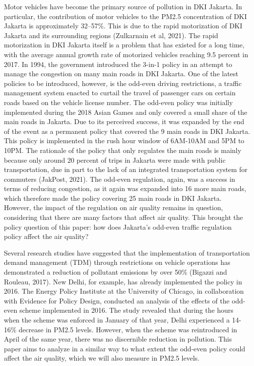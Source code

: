 \documentclass[
]{article}
\begin{document}
Motor vehicles have become the primary source of pollution in DKI
Jakarta. In particular, the contribution of motor vehicles to the PM2.5
concentration of DKI Jakarta is approximately 32--57\%. This is due to
the rapid motorization of DKI Jakarta and its surrounding regions
(Zulkarnain et al, 2021). The rapid motorization in DKI Jakarta itself
is a problem that has existed for a long time, with the average annual
growth rate of motorized vehicles reaching 9.5 percent in 2017. In 1994,
the government introduced the 3-in-1 policy in an attempt to manage the
congestion on many main roads in DKI Jakarta. One of the latest policies
to be introduced, however, is the odd-even driving restrictions, a
traffic management system enacted to curtail the travel of passenger
cars on certain roads based on the vehicle license number. The odd-even
policy was initially implemented during the 2018 Asian Games and only
covered a small share of the main roads in Jakarta. Due to its perceived
success, it was expanded by the end of the event as a permanent policy
that covered the 9 main roads in DKI Jakarta. This policy is implemented
in the rush hour window of 6AM-10AM and 5PM to 10PM. The rationale of
the policy that only regulates the main roads is mainly because only
around 20 percent of trips in Jakarta were made with public
transportation, due in part to the lack of an integrated transportation
system for commuters (JakPost, 2021). The odd-even regulation, again,
was a success in terms of reducing congestion, as it again was expanded
into 16 more main roads, which therefore made the policy covering 25
main roads in DKI Jakarta. However, the impact of the regulation on air
quality remains in question, considering that there are many factors
that affect air quality. This brought the policy question of this paper:
how does Jakarta's odd-even traffic regulation policy affect the air
quality?

Several research studies have suggested that the implementation of
transportation demand management (TDM) through restrictions on vehicle
operations has demonstrated a reduction of pollutant emissions by over
50\% (Bigazzi and Rouleau, 2017). New Delhi, for example, has already
implemented the policy in 2016. The Energy Policy Institute at the
University of Chicago, in collaboration with Evidence for Policy Design,
conducted an analysis of the effects of the odd-even scheme implemented
in 2016. The study revealed that during the hours when the scheme was
enforced in January of that year, Delhi experienced a 14-16\% decrease
in PM2.5 levels. However, when the scheme was reintroduced in April of
the same year, there was no discernible reduction in pollution. This
paper aims to analyze in a similar way to what extent the odd-even
policy could affect the air quality, which we will also measure in PM2.5
levels.
\end{document}
